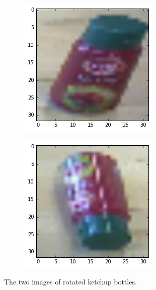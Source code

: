 \documentclass[	DIV=calc,%
				paper=a4,%
				fontsize=11pt,%
				twocolumn]{scrartcl}	 %
\begin{document}
\begin{figure}[H]
    \centering
    \begin{subfigure}[b]{0.45\linewidth}
        \includegraphics[width=\linewidth]{data/ketchup_final_1.png}
    \end{subfigure}
    \hfill
    \begin{subfigure}[b]{0.45\linewidth}
        \includegraphics[width=\linewidth]{data/ketchup_final_2.png}
    \end{subfigure}
    \caption{The two images of rotated ketchup bottles.}
    \label{}
\end{figure}
\end{document}
